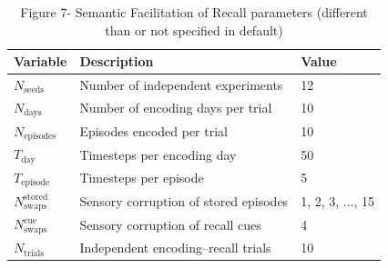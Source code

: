 \documentclass{article}
\begin{document}
\begin{table}[h!]
\centering
\caption{Figure 7- Semantic Facilitation of Recall parameters (different than or not specified in default)}
\label{tab:semantic_facilitation_recall}
\begin{tabular}{lll}
\toprule
\textbf{Variable} & \textbf{Description} & \textbf{Value} \\
\midrule
$N_{\textrm{seeds}}$ & Number of independent experiments & 12 \\
$N_{\textrm{days}}$ & Number of encoding days per trial & 10 \\
$N_{\textrm{episodes}}$ & Episodes encoded per trial & 10 \\
$T_{\textrm{day}}$ & Timesteps per encoding day & 50 \\
$T_{\textrm{episode}}$ & Timesteps per episode & 5 \\
$N_{\textrm{swaps}}^{\textrm{stored}}$ & Sensory corruption of stored episodes & {1, 2, 3, ..., 15} \\
$N_{\textrm{swaps}}^{\textrm{cue}}$ & Sensory corruption of recall cues & 4 \\
$N_{\textrm{trials}}$ & Independent encoding--recall trials & 10 \\
\bottomrule
\end{tabular}
\end{table}
\end{document}
